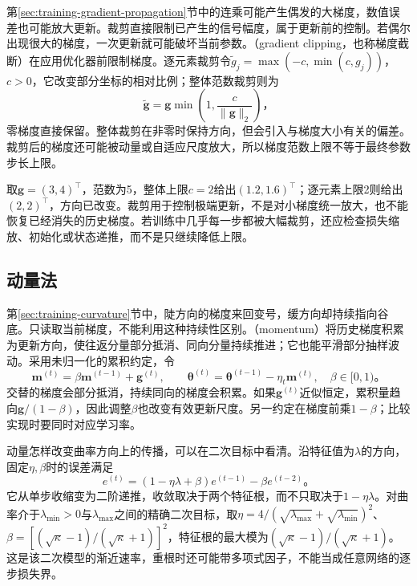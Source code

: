 第\ref{sec:training-gradient-propagation}节中的连乘可能产生偶发的大梯度，数值误差也可能放大更新。裁剪直接限制已产生的信号幅度，属于更新前的控制。若偶尔出现很大的梯度，一次更新就可能破坏当前参数。（gradient clipping，也称梯度截断）在应用优化器前限制梯度。逐元素裁剪令$\tilde g_j=\max(-c,\min(c,g_j))$，$c>0$，它改变部分坐标的相对比例；整体范数裁剪则为
\begin{equation}
  \tilde{\bm g}=\bm g\min\left(1,\frac{c}{\lVert\bm g\rVert_2}\right)\text{，}
  \label{eq:training-norm-clipping}
\end{equation}
零梯度直接保留。整体裁剪在非零时保持方向，但会引入与梯度大小有关的偏差。裁剪后的梯度还可能被动量或自适应尺度放大，所以梯度范数上限不等于最终参数步长上限。

取$\bm g=(3,4)^{\top}$，范数为5，整体上限$c=2$给出$(1.2,1.6)^{\top}$；逐元素上限2则给出$(2,2)^{\top}$，方向已改变。裁剪用于控制极端更新，不是对小梯度统一放大，也不能恢复已经消失的历史梯度。若训练中几乎每一步都被大幅裁剪，还应检查损失缩放、初始化或状态递推，而不是只继续降低上限。

\subsection{动量法}
\label{sec:training-momentum}

第\ref{sec:training-curvature}节中，陡方向的梯度来回变号，缓方向却持续指向谷底。只读取当前梯度，不能利用这种持续性区别。（momentum）将历史梯度积累为更新方向，使往返分量部分抵消、同向分量持续推进；它也能平滑部分抽样波动。采用未归一化的累积约定，令
\begin{equation}
  \bm m^{(t)}=\beta\bm m^{(t-1)}+\bm g^{(t)},\qquad
  \bm\theta^{(t)}=\bm\theta^{(t-1)}-\eta_t\bm m^{(t)},
  \quad\beta\in[0,1)\text{。}
  \label{eq:training-momentum}
\end{equation}
交替的梯度会部分抵消，持续同向的梯度会积累。如果$\bm g^{(t)}$近似恒定，累积量趋向$\bm g/(1-\beta)$，因此调整$\beta$也改变有效更新尺度。另一约定在梯度前乘$1-\beta$；比较实现时要同时对应学习率。

动量怎样改变曲率方向上的传播，可以在二次目标中看清。沿特征值为$\lambda$的方向，固定$\eta,\beta$时的误差满足
\begin{equation}
  e^{(t)}=(1-\eta\lambda+\beta)e^{(t-1)}-\beta e^{(t-2)}\text{。}
  \label{eq:training-momentum-quadratic}
\end{equation}
它从单步收缩变为二阶递推，收敛取决于两个特征根，而不只取决于$1-\eta\lambda$。对曲率介于$\lambda_{\min}>0$与$\lambda_{\max}$之间的精确二次目标，取$\eta=4/(\sqrt{\lambda_{\max}}+\sqrt{\lambda_{\min}})^2$、$\beta=[(\sqrt\kappa-1)/(\sqrt\kappa+1)]^2$，特征根的最大模为$(\sqrt\kappa-1)/(\sqrt\kappa+1)$。这是该二次模型的渐近速率，重根时还可能带多项式因子，不能当成任意网络的逐步损失界。

